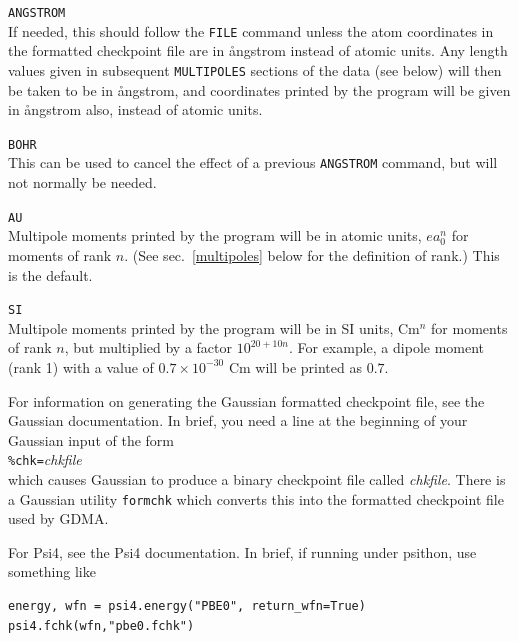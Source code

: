 \documentclass[12pt,txfonts]{paper}
\let\cite=\citep
\begin{document}
\hspace*{2 em}\verb/ANGSTROM/\\
If needed, this should follow the \verb+FILE+ command unless the atom
coordinates in 
the formatted checkpoint file are in {\aa}ngstrom instead of atomic units.
Any length values given in subsequent \verb+MULTIPOLES+ sections of the data
(see below) will then be taken to be in {\aa}ngstrom, and coordinates printed
by the program will be given in {\aa}ngstrom also, instead of atomic units.

\hspace*{2 em}\verb/BOHR/\\
This can be used to cancel the effect of a previous \verb/ANGSTROM/
command, but will not normally be needed.

\hspace*{2 em}\verb/AU/\\
Multipole moments printed by the program will be in atomic units,
$ea_0^n$ for moments of rank $n$. (See sec.~\ref{multipoles} below for
the definition of rank.) This is the default.

\hspace*{2 em}\verb/SI/\\
\label{SI}%
Multipole moments printed by the program will be in SI units, Cm$^n$
for moments of rank $n$, but multiplied by a factor $10^{20+10n}$. For
example, a dipole moment (rank 1) with a value of $0.7\times10^{-30}$
Cm will be printed as $0.7$.

For information on generating the Gaussian formatted checkpoint file,
see the Gaussian documentation. In brief, you need a line at the
beginning of your Gaussian input of the form\\
\hspace*{2 em}\verb:%chk=:\emph{chkfile}\\
which causes Gaussian to produce a binary checkpoint file called
\emph{chkfile}. There is a Gaussian utility \verb+formchk+ which
converts this into the formatted checkpoint file used by GDMA.

For Psi4, see the Psi4 documentation\cite{Psi4-1.4}. In brief, if
running under psithon, use something like\\[6pt]
\hspace{1em}\begin{minipage}[c]{100mm}
\begin{verbatim}
energy, wfn = psi4.energy("PBE0", return_wfn=True)
psi4.fchk(wfn,"pbe0.fchk")
\end{verbatim}
  \end{minipage}
\end{document}
